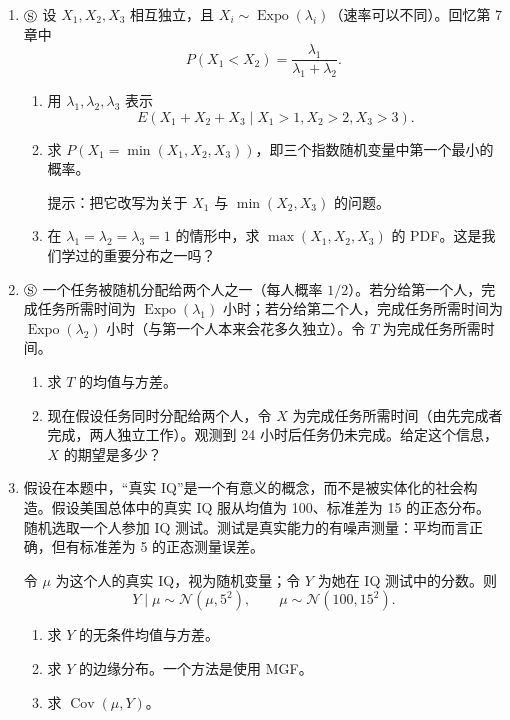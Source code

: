\documentclass[UTF8,12pt,a4paper,fontset=fandol]{ctexart}
\begin{document}
\begin{enumerate}
  \item $\circledS$ 设 $X_1,X_2,X_3$ 相互独立，且 $X_i\sim\operatorname{Expo}(\lambda_i)$（速率可以不同）。回忆第 7 章中
  \[
    P(X_1<X_2)=\frac{\lambda_1}{\lambda_1+\lambda_2}.
  \]
  \begin{enumerate}
    \item[(a)] 用 $\lambda_1,\lambda_2,\lambda_3$ 表示
    \[
      E(X_1+X_2+X_3\mid X_1>1,X_2>2,X_3>3).
    \]
    \item[(b)] 求 $P(X_1=\min(X_1,X_2,X_3))$，即三个指数随机变量中第一个最小的概率。

    \noindent 提示：把它改写为关于 $X_1$ 与 $\min(X_2,X_3)$ 的问题。

    \item[(c)] 在 $\lambda_1=\lambda_2=\lambda_3=1$ 的情形中，求 $\max(X_1,X_2,X_3)$ 的 PDF。这是我们学过的重要分布之一吗？
  \end{enumerate}

  \item $\circledS$ 一个任务被随机分配给两个人之一（每人概率 $1/2$）。若分给第一个人，完成任务所需时间为 $\operatorname{Expo}(\lambda_1)$ 小时；若分给第二个人，完成任务所需时间为 $\operatorname{Expo}(\lambda_2)$ 小时（与第一个人本来会花多久独立）。令 $T$ 为完成任务所需时间。
  \begin{enumerate}
    \item[(a)] 求 $T$ 的均值与方差。
    \item[(b)] 现在假设任务同时分配给两个人，令 $X$ 为完成任务所需时间（由先完成者完成，两人独立工作）。观测到 24 小时后任务仍未完成。给定这个信息，$X$ 的期望是多少？
  \end{enumerate}

  \item 假设在本题中，“真实 IQ”是一个有意义的概念，而不是被实体化的社会构造。假设美国总体中的真实 IQ 服从均值为 100、标准差为 15 的正态分布。随机选取一个人参加 IQ 测试。测试是真实能力的有噪声测量：平均而言正确，但有标准差为 5 的正态测量误差。

  令 $\mu$ 为这个人的真实 IQ，视为随机变量；令 $Y$ 为她在 IQ 测试中的分数。则
  \[
    Y\mid\mu\sim\mathcal N(\mu,5^2),\qquad
    \mu\sim\mathcal N(100,15^2).
  \]
  \begin{enumerate}
    \item[(a)] 求 $Y$ 的无条件均值与方差。
    \item[(b)] 求 $Y$ 的边缘分布。一个方法是使用 MGF。
    \item[(c)] 求 $\operatorname{Cov}(\mu,Y)$。
  \end{enumerate}


\end{enumerate}
\end{document}
